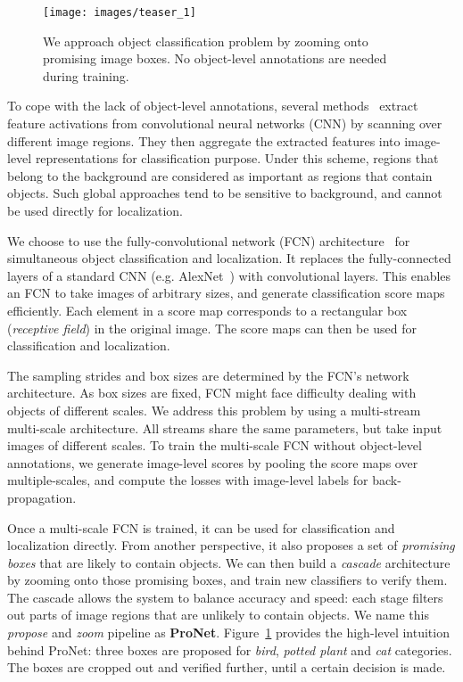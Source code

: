 \documentclass[10pt,twocolumn,letterpaper]{article}
\begin{document}
\begin{figure}[t]
  \centering
    \texttt{[image: images/teaser\_1]}
  \caption{We approach object classification problem by zooming onto promising image boxes. No object-level annotations are needed during training.}
  \label{fig:teaser}
\end{figure}

To cope with the lack of object-level annotations, several methods~\cite{DBLP:journals/corr/ChatfieldSVZ14,DBLP:journals/corr/GongWGL14,Simonyan14c} extract feature activations from convolutional neural networks (CNN) by scanning over different image regions. They then aggregate the extracted features into image-level representations for classification purpose. Under this scheme, regions that belong to the background are considered as important as regions that contain objects. Such global approaches tend to be sensitive to background, and cannot be used directly for localization.

We choose to use the fully-convolutional network (FCN) architecture~\cite{DBLP:journals/corr/LongSD14,Oquab_2015_CVPR,pinheiro:2015a,DBLP:journals/corr/SermanetEZMFL13,DBLP:journals/corr/PathakSLD14} for simultaneous object classification and localization. It replaces the fully-connected layers of a standard CNN (e.g. AlexNet~\cite{NIPS2012_4824}) with convolutional layers. This enables an FCN to take images of arbitrary sizes, and generate classification score maps efficiently. Each element in a score map corresponds to a rectangular box (\textit{receptive field}) in the original image. The score maps can then be used for classification and localization.

The sampling strides and box sizes are determined by the FCN's network architecture. As box sizes are fixed, FCN might face difficulty dealing with objects of different scales. We address this problem by using a multi-stream multi-scale architecture. All streams share the same parameters, but take input images of different scales. To train the multi-scale FCN without object-level annotations, we generate image-level scores by pooling the score maps over multiple-scales, and compute the losses with image-level labels for back-propagation.






Once a multi-scale FCN is trained, it can be used for classification and localization directly. From another perspective, it also proposes a set of \textit{promising boxes} that are likely to contain objects. We can then build a \textit{cascade} architecture by zooming onto those promising boxes, and train new classifiers to verify them. The cascade allows the system to balance accuracy and speed: each stage filters out parts of image regions that are unlikely to contain objects. We name this \textit{propose} and \textit{zoom} pipeline as \textbf{ProNet}. Figure~\ref{fig:teaser} provides the high-level intuition behind ProNet: three boxes are proposed for \textit{bird}, \textit{potted plant} and \textit{cat} categories. The boxes are cropped out and verified further, until a certain decision is made.
\end{document}
